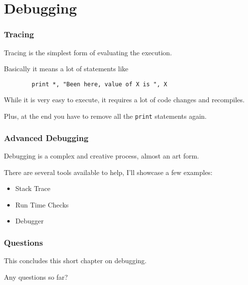 \section{Debugging}

\begin{frame}[fragile]
    \frametitle{Tracing}
    Tracing is the simplest form of evaluating the execution.

    Basically it means a lot of statements like

    \begin{lstlisting}
        print *, "Been here, value of X is ", X
    \end{lstlisting}

    While it is very easy to execute, it requires a lot of code changes and recompiles.

    Plus, at the end you have to remove all the \texttt{print} statements again.
\end{frame}

\begin{frame}
    \frametitle{Advanced Debugging}
    Debugging is a complex and creative process, almost an art form.

    There are several tools available to help, I'll showcase a few examples:

    \begin{itemize}
        \item Stack Trace
        \item Run Time Checks
        \item Debugger
    \end{itemize}

\end{frame}


\begin{frame}
    \frametitle{Questions}
    This concludes this short chapter on debugging.

    Any questions so far?
\end{frame}
